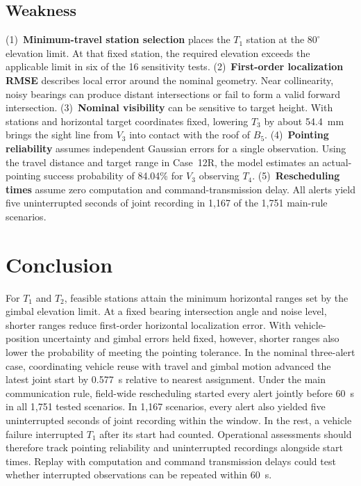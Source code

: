 \documentclass{swmcmthesis}
\begin{document}
\begingroup
\linespread{1.04}\selectfont
\subsection{Weakness}

\noindent\hspace*{\parindent}(1)~\textbf{Minimum-travel station selection} places the \(T_1\) station at the \(80^\circ\) elevation limit. At that fixed station, the required elevation exceeds the applicable limit in six of the 16 sensitivity tests.
(2)~\textbf{First-order localization RMSE} describes local error around the nominal geometry. Near collinearity, noisy bearings can produce distant intersections or fail to form a valid forward intersection.
(3)~\textbf{Nominal visibility} can be sensitive to target height. With stations and horizontal target coordinates fixed, lowering \(T_3\) by about 54.4~mm brings the sight line from \(V_3\) into contact with the roof of \(B_5\).
(4)~\textbf{Pointing reliability} assumes independent Gaussian errors for a single observation. Using the travel distance and target range in Case~12R, the model estimates an actual-pointing success probability of 84.04\% for \(V_3\) observing \(T_4\).
(5)~\textbf{Rescheduling times} assume zero computation and command-transmission delay. All alerts yield five uninterrupted seconds of joint recording in 1,167 of the 1,751 main-rule scenarios.

\section{Conclusion}

For \(T_1\) and \(T_2\), feasible stations attain the minimum horizontal ranges set by the gimbal elevation limit.
At a fixed bearing intersection angle and noise level, shorter ranges reduce first-order horizontal localization error. With vehicle-position uncertainty and gimbal errors held fixed, however, shorter ranges also lower the probability of meeting the pointing tolerance.
In the nominal three-alert case, coordinating vehicle reuse with travel and gimbal motion advanced the latest joint start by 0.577~s relative to nearest assignment.
Under the main communication rule, field-wide rescheduling started every alert jointly before 60~s in all 1,751 tested scenarios. In 1,167 scenarios, every alert also yielded five uninterrupted seconds of joint recording within the window. In the rest, a vehicle failure interrupted \(T_1\) after its start had counted.
Operational assessments should therefore track pointing reliability and uninterrupted recordings alongside start times. Replay with computation and command transmission delays could test whether interrupted observations can be repeated within 60~s.
\par
\endgroup
\end{document}
